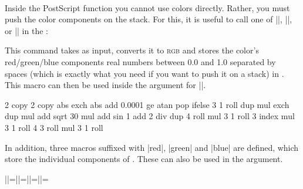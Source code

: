 \begin{command}{\pgfdeclarefunctionalshading{}\\
}
    Inside the PostScript function  you cannot use colors
    directly. Rather, you must push the color components on the stack. For
    this, it is useful to call one of |\pgfshadecolortorgb|,
    |\pgfshadecolortocmyk|, or |\pgfshadecolortogray| in the :

    \begin{command}{\pgfshadecolortorgb{}}
        This command takes  as input, converts it to
        \textsc{rgb} and stores the color's
        red/green/blue components real numbers between 0.0 and 1.0 separated by
        spaces (which is exactly what you need if you want to push it on a
        stack) in . This macro can then be used inside the
         argument for |\pgfdeclarefunctionalshading|.
\begin{codeexample}[]
{\pgfpoint{1cm}{1cm}}{}{
  2 copy        %
  2 copy abs exch abs add 0.0001 ge { atan } { pop } ifelse
  3 1 roll
  dup mul exch
  dup mul add sqrt
  30 mul
  add
  sin
  1 add 2 div
  dup
   4 roll      %
  mul
  3 1 roll
  3 index
  mul
  3 1 roll
  4 3 roll
  mul
  3 1 roll
}
%
%
%
\end{codeexample}

        In addition, three macros suffixed with |red|, |green| and |blue| are
        defined, which store the individual components of .
        These can also be used in the  argument.
\begin{codeexample}[]
|\mycol|=\mycol |\mycolred|=\mycolred |\mycolgreen|=\mycolgreen |\mycolblue|=\mycolblue
\end{codeexample}
    \end{command}


\end{command}
